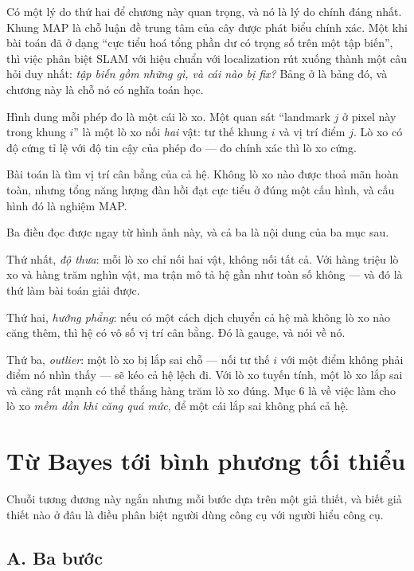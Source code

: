 \documentclass[../../vslam.tex]{subfiles}
\begin{document}
Có một lý do thứ hai để chương này quan trọng, và nó là lý do chính đáng nhất. Khung MAP là chỗ luận đề trung tâm của cây được phát biểu chính xác. Một khi bài toán đã ở dạng ``cực tiểu hoá tổng phần dư có trọng số trên một tập biến'', thì việc phân biệt SLAM với hiệu chuẩn với localization rút xuống thành một câu hỏi duy nhất: \emph{tập biến gồm những gì, và cái nào bị fix?} Bảng ở  là bảng đó, và chương này là chỗ nó có nghĩa toán học.

\begin{trucgiac}
Hình dung mỗi phép đo là một cái lò xo. Một quan sát ``landmark \(j\) ở pixel này trong khung \(i\)'' là một lò xo nối \emph{hai} vật: tư thế khung \(i\) và vị trí điểm \(j\). Lò xo có độ cứng tỉ lệ với độ tin cậy của phép đo --- đo chính xác thì lò xo cứng.

Bài toán là tìm vị trí cân bằng của cả hệ. Không lò xo nào được thoả mãn hoàn toàn, nhưng tổng năng lượng đàn hồi đạt cực tiểu ở đúng một cấu hình, và cấu hình đó là nghiệm MAP.

Ba điều đọc được ngay từ hình ảnh này, và cả ba là nội dung của ba mục sau.

Thứ nhất, \emph{độ thưa}: mỗi lò xo chỉ nối hai vật, không nối tất cả. Với hàng triệu lò xo và hàng trăm nghìn vật, ma trận mô tả hệ gần như toàn số không --- và đó là thứ làm bài toán giải được.

Thứ hai, \emph{hướng phẳng}: nếu có một cách dịch chuyển cả hệ mà không lò xo nào căng thêm, thì hệ có vô số vị trí cân bằng. Đó là gauge, và  nói về nó.

Thứ ba, \emph{outlier}: một lò xo bị lắp sai chỗ --- nối tư thế \(i\) với một điểm không phải điểm nó nhìn thấy --- sẽ kéo cả hệ lệch đi. Với lò xo tuyến tính, một lò xo lắp sai và căng rất mạnh có thể thắng hàng trăm lò xo đúng. Mục 6 là về việc làm cho lò xo \emph{mềm dần khi căng quá mức}, để một cái lắp sai không phá cả hệ.
\end{trucgiac}

\section{Từ Bayes tới bình phương tối thiểu}

Chuỗi tương đương này ngắn nhưng mỗi bước dựa trên một giả thiết, và biết giả thiết nào ở đâu là điều phân biệt người dùng công cụ với người hiểu công cụ.

\subsection{A. Ba bước}
\end{document}
